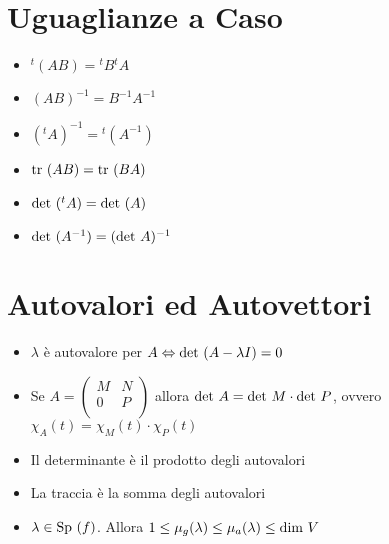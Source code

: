 \documentclass[a4paper,NoNotes,GeneralMath]{stdmdoc}
\begin{document}
	\section*{Uguaglianze a Caso}
	\begin{itemize}
		\item ${}^t(AB) = {}^tB {}^tA$
		\item $(AB)^{-1} = B^{-1}A^{-1}$
		\item $({}^tA)^{-1} = {}^t(A^{-1})$
		\item $\mbox{tr } (AB) = \mbox{tr } (BA)$
		\item $\mbox{det } ({}^tA) = \mbox{det } (A)$
		\item $\mbox{det } (A^{-1}) = (\mbox{det } A)^{-1}$
	\end{itemize}

	\section*{Autovalori ed Autovettori}
	\begin{itemize}
		\item $\lambda$ è autovalore per $A \Leftrightarrow \mbox{det }(A-\lambda I) = 0$
		\item Se $A = \left( \begin{array}{c|c} M & N \\ \hline 0 & P \\ \end{array} \right)$ allora $\mbox{det } A = \mbox{det } M \cdot \mbox{det } P$, ovvero $\chi_A(t) = \chi_M(t) \cdot \chi_P(t)$
		\item Il determinante è il prodotto degli autovalori
		\item La traccia è la somma degli autovalori
		\item $\lambda \in \mbox{Sp }(f)$. Allora $1 \le \mu_g(\lambda) \le \mu_a(\lambda) \le \mbox{dim } V$
	\end{itemize}
\end{document}
